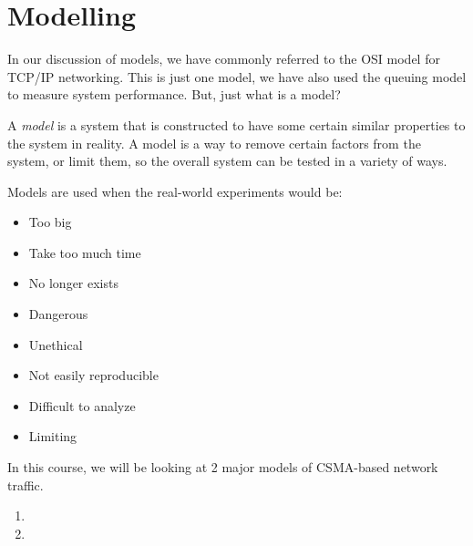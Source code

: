 \section{Modelling}\label{sec:Modelling}
In our discussion of models, we have commonly referred to the OSI model for TCP/IP networking.
This is just one model, we have also used the queuing model to measure system performance.
But, just what is a model?
\begin{definition}[Model]\label{def:Model}
  A \emph{model} is a system that is constructed to have some certain similar properties to the system in reality.
  A model is a way to remove certain factors from the system, or limit them, so the overall system can be tested in a variety of ways.
\end{definition}

Models are used when the real-world experiments would be:
\begin{itemize}[noitemsep]
\item Too big
\item Take too much time
\item No longer exists
\item Dangerous
\item Unethical
\item Not easily reproducible
\item Difficult to analyze
\item Limiting
\end{itemize}

In this course, we will be looking at 2 major models of CSMA-based network traffic.
\begin{enumerate}[noitemsep]
\item {}
\item {}
\end{enumerate}

